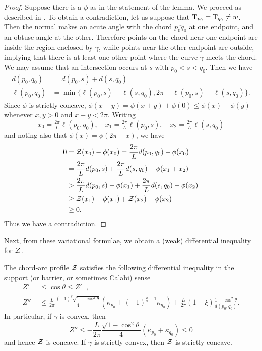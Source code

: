 \documentclass[a4paper, 12pt]{amsart}
\begin{document}
\begin{proof}
Suppose there is a $\phi$ as in the statement of the lemma. We proceed as described in \cite{MR2794630}. To obtain a contradiction, let us suppose that $\operatorname{T}_{p_0} = \operatorname{T}_{q_0} \ne w$. Then the normal makes an acute angle with the chord $\overline{p_0 q_0}$ at one endpoint, and an obtuse angle at the other. Therefore points on the chord near one endpoint are inside the region enclosed by $\gamma$, while points near the other endpoint are outside, implying that there is at least one other point where the curve $\gamma$ meets the chord. We may assume that an intersection occurs at $s$ with $p_0 < s < q_0$. Then we have
\begin{align*}
d(p_0, q_0) &= d(p_0, s) + d(s, q_0) \\
\ell(p_0, q_0) &= \min\{\ell(p_0, s) + \ell(s, q_0),  2\pi -\ell(p_0,s ) - \ell(s, q_0)\}.
\end{align*}
Since $\phi$ is strictly concave, $\phi(x + y) = \phi(x + y) + \phi(0) \leq \phi(x) + \phi(y)$ whenever $x, y > 0$ and $x + y < 2\pi$. Writing
\[
x_0 = \tfrac{2\pi}{L}\ell(p_0, q_0), \quad x_1 = \tfrac{2\pi}{L}\ell(p_0, s), \quad x_2 = \tfrac{2\pi}{L}\ell(s, q_0)
\]
and noting also that $\phi(x) = \phi(2\pi - x)$, we have
\[
\begin{split}
0 &= \operatorname{\mathcal{Z}}(x_0) - \phi(x_0) =  \frac{2\pi}{L} d(p_0, q_0) - \phi(x_0) \\
&= \frac{2\pi}{L}d(p_0, s) + \frac{2\pi}{L} d(s, q_0) - \phi(x_1 + x_2) \\
&> \frac{2\pi}{L} d(p_0, s) - \phi(x_1) + \frac{2\pi}{L}d(s, q_0) - \phi(x_2) \\
&\geq \operatorname{\mathcal{Z}}(x_1) - \phi(x_1) + \operatorname{\mathcal{Z}}(x_2) - \phi(x_2) \\
&\geq 0.
\end{split}
\]
Thus we have a contradiction. 
\end{proof}

Next, from these variational formulae, we obtain a (weak) differential inequality for $\operatorname{\mathcal{Z}}$.

\begin{prop}
\label{prop:barrier}
The chord-arc profile $\operatorname{\mathcal{Z}}$ satisfies the following differential inequality in the support (or barrier, or sometimes Calabi) sense
\begin{align*}
Z'_- &\leq \cos\theta \leq Z'_+, \\
Z'' &\leq \frac{L}{2\pi}\frac{(-1)^{\delta}\sqrt{1-\cos^2\theta}}{4} (\kappa_{p_0} + (-1)^{\xi+1}\kappa_{q_0}) + \frac{L}{2\pi} (1-\xi) \frac{1-\cos^2\theta}{d(p_0,q_0)}.
\end{align*}
In particular, if $\gamma$ is convex, then
\[
Z'' \leq - \frac{L}{2\pi} \frac{\sqrt{1-\cos^2 \theta}}{4} (\kappa_{p_0} + \kappa_{q_0}) \leq 0
\]
and hence $\operatorname{\mathcal{Z}}$ is concave. If $\gamma$ is strictly convex, then $\operatorname{\mathcal{Z}}$ is strictly concave.
\end{prop}
\end{document}
